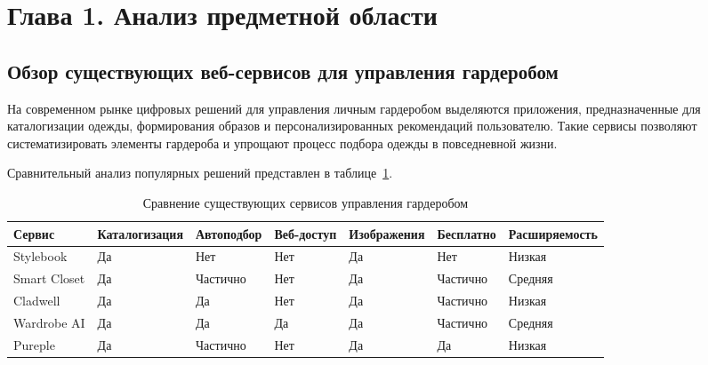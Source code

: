 \section*{Глава 1. Анализ предметной области}

\subsection{Обзор существующих веб-сервисов для управления гардеробом}

На современном рынке цифровых решений для управления личным гардеробом выделяются приложения, предназначенные для каталогизации одежды, формирования образов и персонализированных рекомендаций пользователю. Такие сервисы позволяют систематизировать элементы гардероба и упрощают процесс подбора одежды в повседневной жизни.

Сравнительный анализ популярных решений представлен в таблице~\ref{tab:wardrobe_services}.
\begin{table}[ht!]
	\centering
	\footnotesize
	\setlength{\tabcolsep}{2pt}
	\caption{Сравнение существующих сервисов управления гардеробом}
	\label{tab:wardrobe_services}
	\begin{tabular}{|p{}|p{}|p{}|p{}|p{}|p{}|p{}|}
		\hline
		\textbf{Сервис} &
		\textbf{Каталогизация} &
		\textbf{Автоподбор} &
		\textbf{Веб-доступ} &
		\textbf{Изображения} &
		\textbf{Бесплатно} &
		\textbf{Расширяемость} \\ \hline
		
		Stylebook &
		Да &
		Нет &
		Нет &
		Да &
		Нет &
		Низкая \\ \hline
		
		Smart Closet &
		Да &
		Частично &
		Нет &
		Да &
		Частично &
		Средняя \\ \hline
		
		Cladwell &
		Да &
		Да &
		Нет &
		Да &
		Частично &
		Низкая \\ \hline
		
		Wardrobe AI &
		Да &
		Да &
		Да &
		Да &
		Частично &
		Средняя \\ \hline
		
		Pureple &
		Да &
		Частично &
		Нет &
		Да &
		Да &
		Низкая \\ \hline
		
	\end{tabular}
\end{table}

